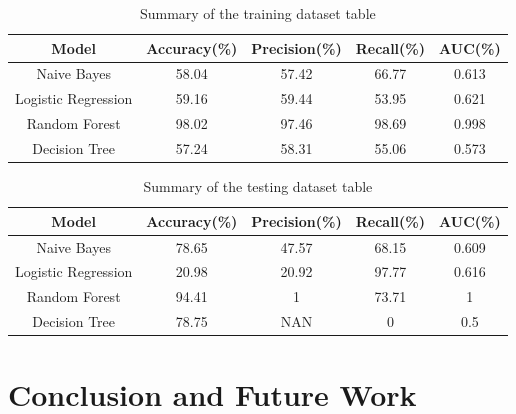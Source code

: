 \documentclass[
  a4paper,
]{article}
\begin{document}
\begin{table}[!htb]
\caption{Summary of the training dataset table} 
\centering
\begin{tabular}{c@{\hskip 0.25in}c@{\hskip 0.25in}c@{\hskip 0.25in}c@{\hskip 0.25in}c@{\hskip 0.25in}}
\hline\hline
Model     & Accuracy(\%)    & Precision(\%)     & Recall(\%)    & AUC(\%) \\ [0.5ex]
\hline
Naive Bayes  &  58.04 & 57.42   & 66.77   & 0.613 \\
Logistic Regression    & 59.16    & 59.44     & 53.95 & 0.621 \\
Random Forest     & 98.02    & 97.46     & 98.69  & 0.998\\
Decision Tree & 57.24    & 58.31     & 55.06     & 0.573 \\ [1ex]
\hline
\end{tabular}
\end{table}

\begin{table}[!htb]
\caption{Summary of the testing dataset table} 
\centering
\begin{tabular}{c@{\hskip 0.25in}c@{\hskip 0.25in}c@{\hskip 0.25in}c@{\hskip 0.25in}c@{\hskip 0.25in}}
\hline\hline
Model     & Accuracy(\%)    & Precision(\%)     & Recall(\%)    & AUC(\%) \\ [0.5ex]
\hline
Naive Bayes  &  78.65 & 47.57   & 68.15   & 0.609 \\
Logistic Regression    & 20.98    & 20.92     & 97.77 & 0.616  \\
Random Forest     & 94.41   & 1     & 73.71  & 1\\
Decision Tree & 78.75    & NAN    & 0     &  0.5\\ [1ex]
\hline
\end{tabular}
\end{table}

\newpage

\hypertarget{conclusion-and-future-work}{%
\section{Conclusion and Future Work}\label{conclusion-and-future-work}}
\end{document}
